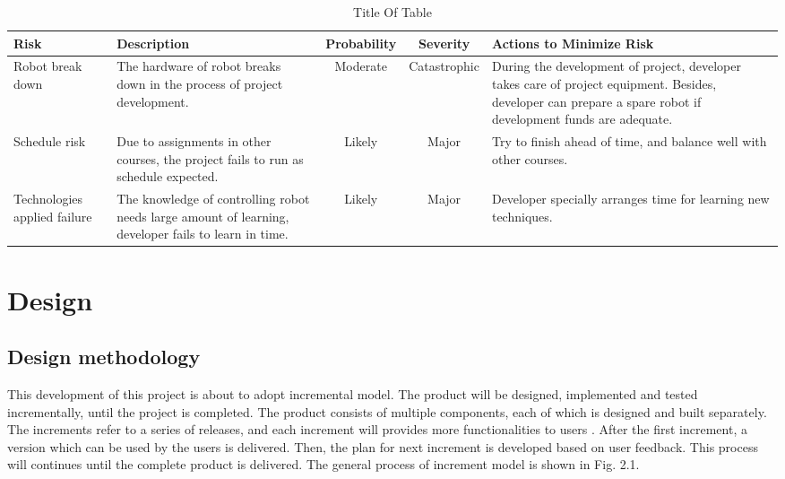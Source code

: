 \documentclass[11pt,times,oneside,openright,hardcopy]{eeereport}
\begin{document}
\begin{table}[h]
\label{tab:tab1}
\centering
\caption{ Title Of Table }
\renewcommand{\arraystretch}{2}
\setlength{\tabcolsep}{10pt}
\begin{tabular}{ | m{2cm} | m{3cm} | c | c | m{3cm} |} 
\hline Risk & Description & Probability & Severity & Actions to Minimize Risk \\ 
\hline Robot break down & The hardware of robot breaks down in the process of project development. & Moderate & Catastrophic & During the development of project, developer takes care of project equipment. Besides, developer can prepare a spare robot if development funds are adequate. \\ 
\hline Schedule risk & Due to assignments in other courses, the project fails to run as schedule expected. & Likely & Major & Try to finish ahead of time, and balance well with other courses. \\ 
\hline Technologies applied failure & The knowledge of controlling robot needs large amount of learning, developer fails to learn in time. & Likely & Major & Developer specially arranges time for learning new techniques. \\ 
\hline 
\end{tabular} 
\end{table}

\chapter{Design}\label{cpt:des}
\section{Design methodology}
This development of this project is about to adopt incremental model. The product will be designed, implemented and tested incrementally, until the project is completed. The product consists of multiple components, each of which is designed and built separately.
The increments refer to a series of releases, and each increment will provides more functionalities to users \cite{Bell:2016vq}. After the first increment, a version which can be used by the users is delivered. Then, the plan for next increment is developed based on user feedback.
This process will continues until the complete product is delivered. The general process of increment model is shown in Fig. 2.1.
\end{document}
